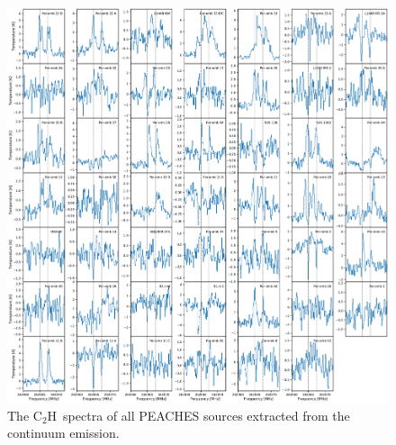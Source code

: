 \documentclass[twocolumn]{aastex62}
\newcommand{\cch}{\mbox{C$_2$H}}
\begin{document}
\begin{figure}[htbp!]
  \centering
  \includegraphics[width=\textwidth]{all_cch.pdf}
  \caption{The \cch\ spectra of all PEACHES sources extracted from the continuum emission.}
  \label{fig:all_cch}
\end{figure}

% 


\end{document}
